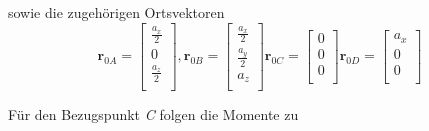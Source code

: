 \documentclass[a4paper,12p]{article}
\begin{document}
sowie die zugehörigen Ortsvektoren
\begin{equation*}
	\textbf{r}_{0A} = \left[\begin{array}{c} \frac{a_{x}}{2} \\ 0 \\ \frac{a_{z}}{2} \\\end{array}\right] ,
	\textbf{r}_{0B} = \left[\begin{array}{c} \frac{a_{x}}{2} \\ \frac{a_{y}}{2} \\ a_{z} \\\end{array}\right]
	\textbf{r}_{0C} = \left[\begin{array}{c} 0 \\ 0 \\ 0 \\\end{array}\right]
	\textbf{r}_{0D} = \left[\begin{array}{c} a_{x} \\ 0 \\ 0 \\\end{array}\right]
\end{equation*}
\newpage
\begin{flushleft}
	Für den Bezugspunkt \textit{C} folgen die Momente zu
\end{flushleft}
\end{document}
